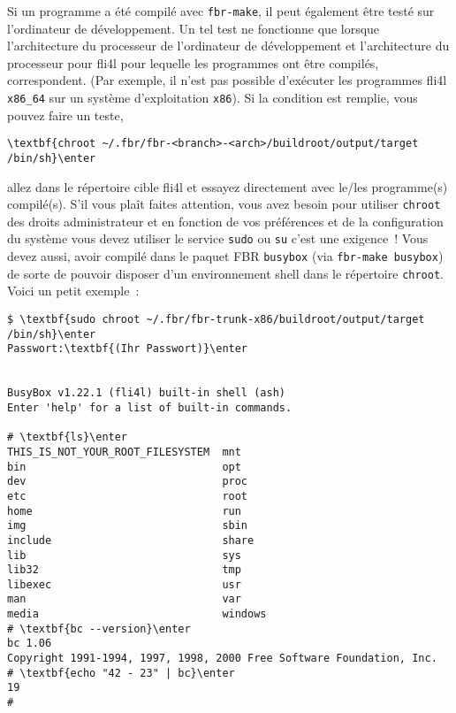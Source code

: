 
Si un programme a été compilé avec \texttt{fbr-make}, il peut également être
testé sur l'ordinateur de développement. Un tel test ne fonctionne que lorsque
l'architecture du processeur de l'ordinateur de développement et l'architecture
du processeur pour fli4l pour lequelle les programmes ont être compilés,
correspondent. (Par exemple, il n'est pas possible d'exécuter les programmes
fli4l \texttt{x86\_64} sur un système d'exploitation \texttt{x86}). Si la
condition est remplie, vous pouvez faire un teste,

\begin{example}
\begin{Verbatim}[commandchars=\\\{\}]
\textbf{chroot ~/.fbr/fbr-<branch>-<arch>/buildroot/output/target /bin/sh}\enter
\end{Verbatim}
\end{example}

\noindent allez dans le répertoire cible fli4l et essayez directement avec le/les
programme(s) compilé(s). S'il vous plaît faites attention, vous avez besoin pour
utiliser \texttt{chroot} des droits administrateur et en fonction de vos
préférences et de la configuration du système vous devez utiliser le service
\texttt{sudo} ou \texttt{su} c'est une exigence~! Vous devez aussi, avoir
compilé dans le paquet FBR \texttt{busybox} (via \texttt{fbr-make busybox}) de
sorte de pouvoir disposer d'un environnement shell dans le répertoire \texttt{chroot}.
Voici un petit exemple~:

\begin{example}
\begin{Verbatim}[commandchars=\\\{\}]
$ \textbf{sudo chroot ~/.fbr/fbr-trunk-x86/buildroot/output/target /bin/sh}\enter
Passwort:\textbf{(Ihr Passwort)}\enter


BusyBox v1.22.1 (fli4l) built-in shell (ash)
Enter 'help' for a list of built-in commands.

# \textbf{ls}\enter
THIS_IS_NOT_YOUR_ROOT_FILESYSTEM  mnt
bin                               opt
dev                               proc
etc                               root
home                              run
img                               sbin
include                           share
lib                               sys
lib32                             tmp
libexec                           usr
man                               var
media                             windows
# \textbf{bc --version}\enter
bc 1.06
Copyright 1991-1994, 1997, 1998, 2000 Free Software Foundation, Inc.
# \textbf{echo "42 - 23" | bc}\enter
19
#
\end{Verbatim}
\end{example}

